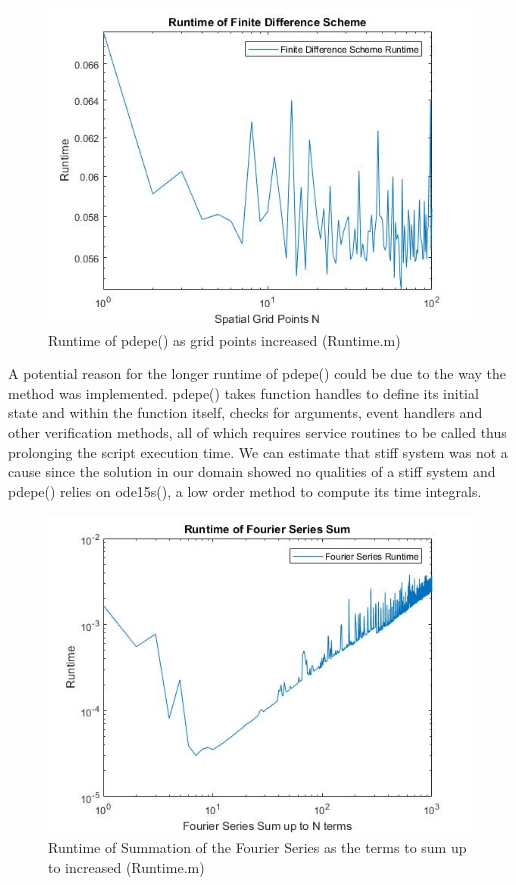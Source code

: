 \documentclass{article}
\begin{document}
\newpage
\begin{figure}[hp]
	\begin{center}
		\includegraphics[width=\textwidth,height=\textheight,keepaspectratio]{MATLAB/FDMRuntime.jpg}
	\end{center}
	\caption{Runtime of pdepe() as grid points increased (Runtime.m)}
\end{figure}
A potential reason for the longer runtime of pdepe() could be due to the way the method was implemented. pdepe() takes function handles to define its initial state and within the function itself, checks for arguments, event handlers and other verification methods, all of which requires service routines to be called thus prolonging the script execution time. We can estimate that stiff system was not a cause since the solution in our domain showed no qualities of a stiff system and pdepe() relies on ode15s(), a low order method to compute its time integrals.
\newpage
\begin{figure}[hp]
	\begin{center}
		\includegraphics[width=\textwidth,height=\textheight,keepaspectratio]{MATLAB/FSRuntime.jpg}
	\end{center}
	\caption{Runtime of Summation of the Fourier Series as the terms to sum up to increased (Runtime.m)}
\end{figure}
\end{document}
